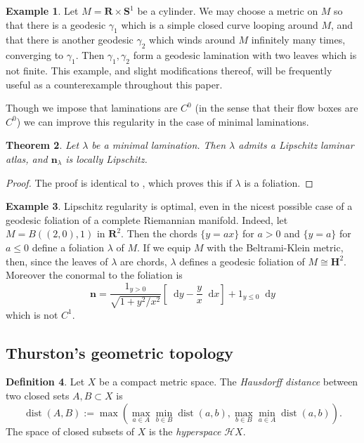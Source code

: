 \documentclass[reqno,11pt]{amsart}
\newcommand{\RR}{\mathbf{R}}
\newcommand{\Hyp}{\mathbf H}
\newcommand{\Sph}{\mathbf S}
\newcommand*\dif{\mathop{}\!\mathrm{d}}
\DeclareMathOperator{\dist}{dist}
\newcommand{\Hypspace}{\mathscr H}
\newcommand{\normal}{\mathbf n}
\newcommand{\dfn}[1]{\emph{#1}\index{#1}}
\newtheorem{theorem}{Theorem}[section]
\theoremstyle{definition}
\newtheorem{definition}[theorem]{Definition}
\newtheorem{example}[theorem]{Example}
\numberwithin{equation}{section}
\begin{document}
\begin{example}\label{two geodesics}
Let $M = \RR \times \Sph^1$ be a cylinder.
We may choose a metric on $M$ so that there is a geodesic $\gamma_1$ which is a simple closed curve looping around $M$, and that there is another geodesic $\gamma_2$ which winds around $M$ infinitely many times, converging to $\gamma_1$.
Then $\gamma_1, \gamma_2$ form a geodesic lamination with two leaves which is not finite.
This example, and slight modifications thereof, will be frequently useful as a counterexample throughout this paper.
\end{example}

Though we impose that laminations are $C^0$ (in the sense that their flow boxes are $C^0$) we can improve this regularity in the case of minimal laminations.

\begin{theorem}\label{regularity theorem}
Let $\lambda$ be a minimal lamination. Then $\lambda$ admits a Lipschitz laminar atlas, and $\normal_\lambda$ is locally Lipschitz.
\end{theorem}
\begin{proof}
The proof is identical to \cite[Theorem 1.1]{Solomon86}, which proves this if $\lambda$ is a foliation.
\end{proof}

\begin{example}
Lipschitz regularity is optimal, even in the nicest possible case of a geodesic foliation of a complete Riemannian manifold.
Indeed, let $M = B((2, 0), 1)$ in $\RR^2$. Then the chords $\{y = ax\}$ for $a > 0$ and $\{y = a\}$ for $a \leq 0$ define a foliation $\lambda$ of $M$.
If we equip $M$ with the Beltrami-Klein metric, then, since the leaves of $\lambda$ are chords, $\lambda$ defines a geodesic foliation of $M \cong \Hyp^2$.
Moreover the conormal to the foliation is
$$\normal = \frac{1_{y > 0}}{\sqrt{1 + y^2/x^2}} \left[\dif y - \frac{y}{x} \dif x\right] + 1_{y \leq 0} \dif y$$
which is not $C^1$.
\end{example}


\subsection{Thurston's geometric topology}

\begin{definition}
Let $X$ be a compact metric space. The \dfn{Hausdorff distance} between two closed sets $A, B \subset X$ is
$$\dist(A, B) := \max\left(\max_{a \in A} \min_{b \in B} \dist(a, b), \max_{b \in B} \min_{a \in A} \dist(a, b)\right).$$
The space of closed subsets of $X$ is the \dfn{hyperspace} $\Hypspace X$.
\end{definition}
\end{document}
